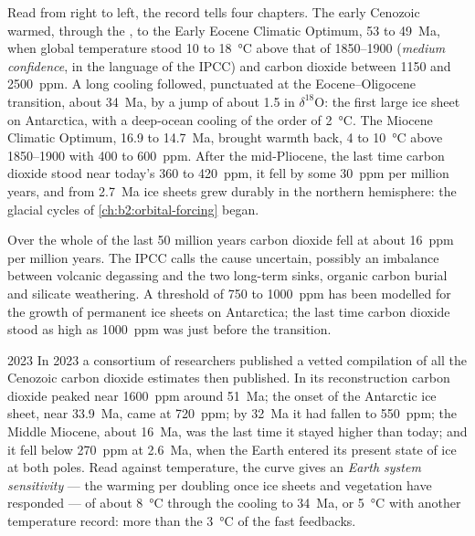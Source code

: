 Read from right to left, the record tells four chapters. The early Cenozoic warmed, through the
, to the Early Eocene Climatic Optimum, 53 to \qty{49}{Ma}, when
global temperature stood 10 to \qty{18}{\celsius} above that of 1850--1900 (\emph{medium
confidence}, in the language of the IPCC) and carbon dioxide between 1150 and \qty{2500}{ppm}.
A long cooling followed, punctuated at the Eocene--Oligocene transition, about \qty{34}{Ma}, by a
jump of about \qty{1.5}{\permil} in $\delta^{18}$O: the first large ice sheet on Antarctica, with a
deep-ocean cooling of the order of \qty{2}{\celsius}. The Miocene Climatic Optimum, 16.9 to
\qty{14.7}{Ma}, brought warmth back, 4 to \qty{10}{\celsius} above 1850--1900 with 400 to
\qty{600}{ppm}. After the mid-Pliocene, the last time carbon dioxide stood near today's 360 to
\qty{420}{ppm}, it fell by some \qty{30}{ppm} per million years, and from \qty{2.7}{Ma} ice sheets
grew durably in the northern hemisphere: the glacial cycles of \cref{ch:b2:orbital-forcing} began.

Over the whole of the last 50 million years carbon dioxide fell at about \qty{16}{ppm} per million
years. The IPCC calls the cause uncertain, possibly an imbalance between volcanic degassing and the
two long-term sinks, organic carbon burial and silicate weathering. A threshold of 750 to
\qty{1000}{ppm} has been modelled for the growth of permanent ice sheets on Antarctica; the last time
carbon dioxide stood as high as \qty{1000}{ppm} was just before the transition.

\begin{dated}{2023}
In 2023 a consortium of researchers published a vetted compilation of all the Cenozoic carbon
dioxide estimates then published. In its reconstruction carbon dioxide peaked near \qty{1600}{ppm} around
\qty{51}{Ma}; the onset of the Antarctic ice sheet, near \qty{33.9}{Ma}, came at \qty{720}{ppm}; by
\qty{32}{Ma} it had fallen to \qty{550}{ppm}; the Middle Miocene, about \qty{16}{Ma}, was the last
time it stayed higher than today; and it fell below \qty{270}{ppm} at \qty{2.6}{Ma}, when the Earth
entered its present state of ice at both poles. Read against temperature, the curve gives an
\emph{Earth system sensitivity} --- the warming per doubling once ice sheets and vegetation have
responded --- of about \qty{8}{\celsius} through the cooling to \qty{34}{Ma}, or \qty{5}{\celsius}
with another temperature record: more than the \qty{3}{\celsius} of the fast feedbacks.
\end{dated}

